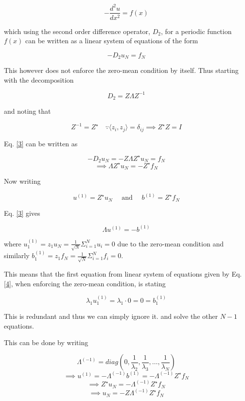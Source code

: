 \documentclass{article}
\begin{document}
\[
	-\frac{d^2u}{dx^2} = f(x)
\]

which using the second order difference operator, $D_2$, for a periodic function $f(x)$ can be written as a linear system of equations of the form

\begin{equation*}
	- D_2 u_N = f_N \tag{$\star 3$} \label{3}
\end{equation*}

This however does not enforce the zero-mean condition by itself. Thus starting with the decomposition

\[
	D_2 = Z \Lambda Z^{-1}
\]

and noting that 

\[
	Z^{-1} = Z^\star \quad \because \langle z_i, z_j \rangle = \delta_{ij} \implies Z^\star Z = I
\]

Eq. \eqref{3} can be written as

\[
	- D_2 u_N = - Z \Lambda Z^\star u_N = f_N
\]
\[
	\implies  \Lambda Z^\star u_N = - Z^\star f_N
\]

Now writing

\[
	u^{(1)} = Z^\star u_N \quad \text{ and } \quad b^{(1)} = Z^\star f_N
\]

Eq. \eqref{3} gives

\begin{equation*}
	\Lambda u^{(1)} = - b^{(1)} \tag{$\star 4$} \label{4}
\end{equation*}

where $u^{(1)}_1 = z_1 u_N = \frac{1}{\sqrt{N}} \Sigma^{N}_{i=1} u_i = 0$ due to the zero-mean condition and similarly $b^{(1)}_1 = z_1 f_N = \frac{1}{\sqrt{N}} \Sigma^{N}_{i=1} f_i = 0$.

This means that the first equation from linear system of equations given by Eq. \eqref{4}, when enforcing the zero-mean condition, is stating 

\[
	\lambda_1 u^{(1)}_1 = \lambda_1 \cdot 0 = 0 = b^{(1)}_1
\]

This is redundant and thus we can simply ignore it. and solve the other $N-1$ equations. 

This can be done by writing 

\[
	\Lambda^{(-1)} = diag(0, \frac{1}{\lambda_2}, \frac{1}{\lambda_3}, \dots, \frac{1}{\lambda_N})
\]
\[
	\implies u^{(1)} = - \Lambda^{(-1)} b^{(1)} = - \Lambda^{(-1)} Z^\star f_N
\]
\[
	\implies Z^\star u_N = - \Lambda^{(-1)} Z^\star f_N
\]
\[
	\implies u_N = - Z \Lambda^{(-1)} Z^\star f_N
\]

\end{document}
